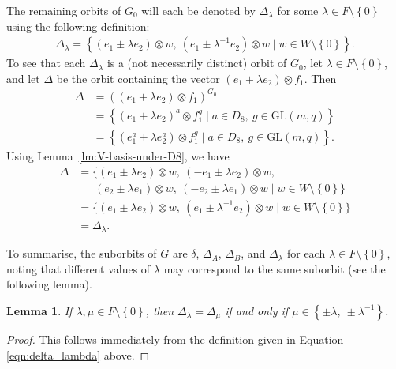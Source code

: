 \documentclass[10pt]{amsart}
\theoremstyle{definition}
\theoremstyle{plain}
\newtheorem{lemma}[lemma]{Lemma}
\theoremstyle{plain}
\theoremstyle{plain}
\theoremstyle{plain}
\newcommand{\GL}{\mathrm{GL}}
\begin{document}
The remaining orbits of $G_0$ will each be denoted by $\Delta_\lambda$ for some $\lambda \in F \setminus \left\{0 \right\}$ using the following definition:
\begin{align} \label{eqn:delta_lambda}
\Delta_\lambda = {\left\{\left(e_1 \pm \lambda e_2 \right) \otimes w,\ \left(e_1 \pm \lambda^{-1} e_2 \right) \otimes w \mid w \in W \setminus \left\{0 \right\}\right\}}.
\end{align}
To see that each $\Delta_\lambda$ is a (not necessarily distinct) orbit of $G_0$, let $\lambda \in F \setminus \left\{0 \right\}$, and let $\Delta$ be the orbit containing the vector $\left(e_1 + \lambda e_2 \right) \otimes f_1$. Then
\begin{align*}
\Delta &= \left(\left(e_1 + \lambda e_2 \right) \otimes f_1 \right)^{G_0} \\
&= \left\{(e_1 + \lambda e_2)^a \otimes f_1^g \mid a \in D_8,\ g \in \GL{\left(m, q \right)}\right\} \\
&= {\left\{(e_1^a + \lambda e_2^a) \otimes f_1^g \mid a \in D_8,\ g \in \GL{\left(m, q \right)}\right\}}.
\end{align*}
Using Lemma~\ref{lm:V-basis-under-D8}, we have
\begin{align*}
\Delta &= \big\{{\left(e_1 \pm \lambda e_2 \right)} \otimes w,\ \left(-e_1 \pm \lambda e_2 \right) \otimes w, \\
&\ \ \ \ \ \ \ \left(e_2 \pm \lambda e_1 \right) \otimes w,\ \left(-e_2 \pm \lambda e_1 \right) \otimes w \mid w \in W \setminus {\left\{0 \right\}}\big\} \\
&= \big\{{\left(e_1 \pm \lambda e_2 \right)} \otimes w,\ \left(e_1 \pm \lambda^{-1} e_2 \right) \otimes w \mid w \in W \setminus {\left\{0 \right\}}\big\} \\
&= \Delta_\lambda.
\end{align*}

To summarise, the suborbits of $G$ are $\delta$, $\Delta_A$, $\Delta_B$, and $\Delta_\lambda$ for each $\lambda \in F \setminus \left\{0 \right\}$, noting that different values of $\lambda$ may correspond to the same suborbit (see the following lemma).

\begin{lemma} \label{lm:suborbit-equivalence}
If $\lambda, \mu \in F \setminus \left\{0 \right\}$, then $\Delta_\lambda = \Delta_\mu$ if and only if $\mu \in \left\{\pm \lambda,\ \pm \lambda^{-1} \right\}$.
\end{lemma}
\begin{proof}
This follows immediately from the definition given in Equation \eqref{eqn:delta_lambda} above.
\end{proof}
\end{document}
